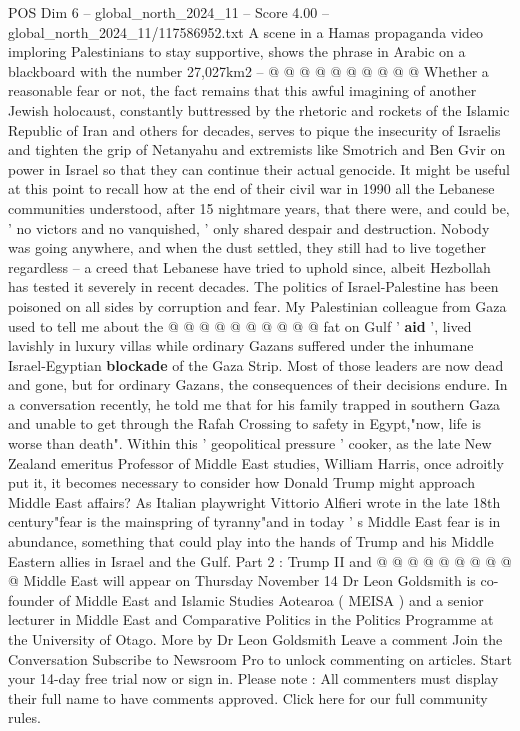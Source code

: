\begin{textsample}{POS Dim 6 – global\_north\_2024\_11 – Score 4.00 – global\_north\_2024\_11/117586952.txt}
A scene in a Hamas propaganda video imploring Palestinians to stay supportive, shows the phrase in Arabic on a blackboard with the number 27,027km2 -- @ @ @ @ @ @ @ @ @ @ Whether a reasonable fear or not, the fact remains that this awful imagining of another Jewish holocaust, constantly buttressed by the rhetoric and rockets of the Islamic Republic of Iran and others for decades, serves to pique the insecurity of Israelis and tighten the grip of Netanyahu and extremists like Smotrich and Ben Gvir on power in Israel so that they can continue their actual genocide.
It might be useful at this point to recall how at the end of their civil war in 1990 all the Lebanese communities understood, after 15 nightmare years, that there were, and could be, ' no victors and no vanquished, ' only shared despair and destruction.
Nobody was going anywhere, and when the dust settled, they still had to live together regardless -- a creed that Lebanese have tried to uphold since, albeit Hezbollah has tested it severely in recent decades.
The politics of Israel-Palestine has been poisoned on all sides by corruption and fear.
My Palestinian colleague from Gaza used to tell me about the @ @ @ @ @ @ @ @ @ @ fat on Gulf ' \textbf{aid} ', lived lavishly in luxury villas while ordinary Gazans suffered under the inhumane Israel-Egyptian \textbf{blockade} of the Gaza Strip.
Most of those leaders are now dead and gone, but for ordinary Gazans, the consequences of their decisions endure.
In a conversation recently, he told me that for his family trapped in southern Gaza and unable to get through the Rafah Crossing to safety in Egypt,"now, life is worse than death".
Within this ' geopolitical pressure ' cooker, as the late New Zealand emeritus Professor of Middle East studies, William Harris, once adroitly put it, it becomes necessary to consider how Donald Trump might approach Middle East affairs?
As Italian playwright Vittorio Alfieri wrote in the late 18th century"fear is the mainspring of tyranny"and in today ' s Middle East fear is in abundance, something that could play into the hands of Trump and his Middle Eastern allies in Israel and the Gulf.
Part 2 : Trump II and @ @ @ @ @ @ @ @ @ @ Middle East will appear on Thursday November 14 Dr Leon Goldsmith is co-founder of Middle East and Islamic Studies Aotearoa ( MEISA ) and a senior lecturer in Middle East and Comparative Politics in the Politics Programme at the University of Otago.
More by Dr Leon Goldsmith Leave a comment Join the Conversation Subscribe to Newsroom Pro to unlock commenting on articles.
Start your 14-day free trial now or sign in.
Please note : All commenters must display their full name to have comments approved.
Click here for our full community rules.

\end{textsample}
